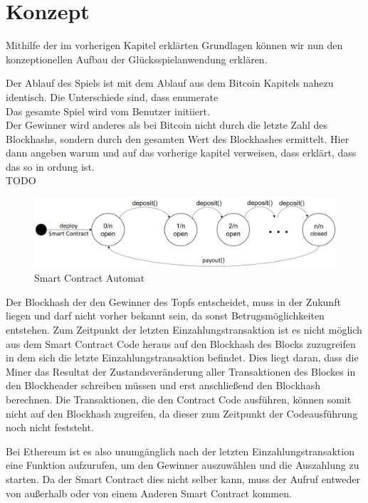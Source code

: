 \section{Konzept}

Mithilfe der im vorherigen Kapitel erklärten Grundlagen können wir nun den konzeptionellen Aufbau der Glücksspielanwendung erklären.\newline
\newline

Der Ablauf des Spiels ist mit dem Ablauf aus dem Bitcoin Kapitels nahezu identisch. Die Unterschiede sind, dass 
enumerate\\
Das gesamte Spiel wird vom Benutzer initiiert.
\\
Der Gewinner wird anderes als bei Bitcoin nicht durch die letzte Zahl des Blockhashs, sondern durch den gesamten Wert des Blockhashes ermittelt. Hier dann angeben warum und auf das vorherige kapitel verweisen, dass erklärt, dass das so in ordung ist.
\\ TODO


\begin{figure}[H]
\centering
\includegraphics[width=1\linewidth]{Figures/umsetzung_eth/smart_contract_automat_idea}
\decoRule
\caption{Smart Contract Automat}
\label{fig:smart_contract_automat_idea}
\end{figure}

Der Blockhash der den Gewinner des Topfs entscheidet, muss in der Zukunft liegen und darf nicht vorher bekannt sein, da sonst Betrugsmöglichkeiten entstehen. Zum Zeitpunkt der letzten Einzahlungstransaktion ist es nicht möglich aus dem Smart Contract Code heraus auf den Blockhash des Blocks zuzugreifen in dem sich die letzte Einzahlungstransaktion befindet. Dies liegt daran, dass die Miner das Resultat der Zustandsveränderung aller Transaktionen des Blockes in den Blockheader schreiben müssen und erst anschließend den Blockhash berechnen. Die Transaktionen, die den Contract Code ausführen, können somit nicht auf den Blockhash zugreifen, da dieser zum Zeitpunkt der Codeausführung noch nicht feststeht. 

Bei Ethereum ist es also unumgänglich nach der letzten Einzahlungstransaktion eine Funktion aufzurufen, um den Gewinner auszuwählen und die Auszahlung zu starten.
Da der Smart Contract dies nicht selber kann, muss der Aufruf entweder von außerhalb oder von einem Anderen Smart Contract kommen.

